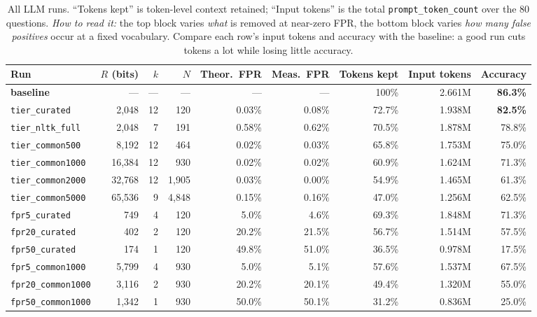 \documentclass[11pt]{article}
\newcommand{\code}[1]{\texttt{#1}}
\begin{document}
\begin{table}[h]
\centering
\footnotesize
\setlength{\tabcolsep}{4pt}
\begin{tabular}{@{}lrrrrrrrr@{}}
\toprule
Run & $R$ (bits) & $k$ & $N$ & Theor.\ FPR & Meas.\ FPR & Tokens kept & Input tokens & Accuracy \\
\midrule
\textbf{baseline} & --- & --- & --- & --- & --- & 100\% & 2.661M & \textbf{86.3\%} \\
\code{tier\_curated}    & 2{,}048  & 12 & 120    & 0.03\% & 0.08\% & 72.7\% & 1.938M & \textbf{82.5\%} \\
\code{tier\_nltk\_full} & 2{,}048  & 7  & 191    & 0.58\% & 0.62\% & 70.5\% & 1.878M & 78.8\% \\
\code{tier\_common500}  & 8{,}192  & 12 & 464    & 0.02\% & 0.03\% & 65.8\% & 1.753M & 75.0\% \\
\code{tier\_common1000} & 16{,}384 & 12 & 930    & 0.02\% & 0.02\% & 60.9\% & 1.624M & 71.3\% \\
\code{tier\_common2000} & 32{,}768 & 12 & 1{,}905 & 0.03\% & 0.00\% & 54.9\% & 1.465M & 61.3\% \\
\code{tier\_common5000} & 65{,}536 & 9  & 4{,}848 & 0.15\% & 0.16\% & 47.0\% & 1.256M & 62.5\% \\
\midrule
\code{fpr5\_curated}    & 749 & 4 & 120 & 5.0\%  & 4.6\%  & 69.3\% & 1.848M & 71.3\% \\
\code{fpr20\_curated}   & 402 & 2 & 120 & 20.2\% & 21.5\% & 56.7\% & 1.514M & 57.5\% \\
\code{fpr50\_curated}   & 174 & 1 & 120 & 49.8\% & 51.0\% & 36.5\% & 0.978M & 17.5\% \\
\code{fpr5\_common1000}  & 5{,}799 & 4 & 930 & 5.0\%  & 5.1\%  & 57.6\% & 1.537M & 67.5\% \\
\code{fpr20\_common1000} & 3{,}116 & 2 & 930 & 20.2\% & 20.1\% & 49.4\% & 1.320M & 55.0\% \\
\code{fpr50\_common1000} & 1{,}342 & 1 & 930 & 50.0\% & 50.1\% & 31.2\% & 0.836M & 25.0\% \\
\bottomrule
\end{tabular}
\caption{All LLM runs. ``Tokens kept'' is token-level context retained; ``Input tokens'' is the total
\code{prompt\_token\_count} over the 80 questions. \emph{How to read it:} the top block varies
\emph{what} is removed at near-zero FPR, the bottom block varies \emph{how many false positives} occur
at a fixed vocabulary. Compare each row's input tokens and accuracy with the baseline: a good run
cuts tokens a lot while losing little accuracy.}
\label{tab:summary}
\end{table}
\end{document}

